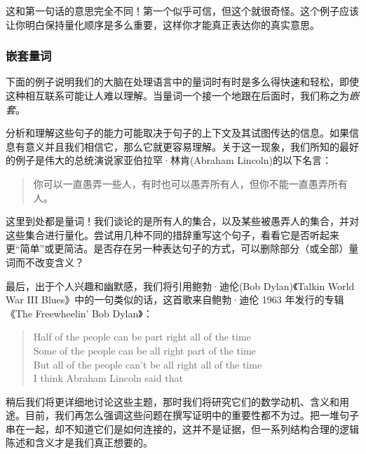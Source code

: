 这和第一句话的意思完全不同！第一个似乎可信，但这个就很奇怪。这个例子应该让你明白保持量化顺序是多么重要，这样你才能真正表达你的真实意思。

\subsubsection*{嵌套量词}

下面的例子说明我们的大脑在处理语言中的量词时有时是多么得快速和轻松，即使这种相互联系可能让人难以理解。当量词一个接一个地跟在后面时，我们称之为\textit{嵌套}。

分析和理解这些句子的能力可能取决于句子的上下文及其试图传达的信息。如果信息有意义并且我们相信它，那么它就更容易理解。关于这一现象，我们所知的最好的例子是伟大的总统演说家亚伯拉罕·林肯(Abraham Lincoln)的以下名言：

\begin{quote}
    你可以一直愚弄一些人，有时也可以愚弄所有人，但你不能一直愚弄所有人。
\end{quote}

这里到处都是量词！我们谈论的是所有人的集合，以及某些被愚弄人的集合，并对这些集合进行量化。尝试用几种不同的措辞重写这个句子，看看它是否听起来更“简单”或更简洁。是否存在另一种表达句子的方式，可以删除部分（或全部）量词而不改变含义？

最后，出于个人兴趣和幽默感，我们将引用鲍勃·迪伦(Bob Dylan)《Talkin World War III Blues》中的一句类似的话，这首歌来自鲍勃·迪伦 1963 年发行的专辑《The Freewheelin' Bob Dylan》：

\begin{quote}
    Half of the people can be part right all of the time\\
    Some of the people can be all right part of the time\\
    But all of the people can't be all right all of the time\\
    I think Abraham Lincoln said that
\end{quote}

稍后我们将更详细地讨论这些主题，那时我们将研究它们的数学动机、含义和用途。目前，我们再怎么强调这些问题在撰写证明中的重要性都不为过。把一堆句子串在一起，却不知道它们是如何连接的，这并不是证据，但一系列结构合理的逻辑陈述和含义才是我们真正想要的。